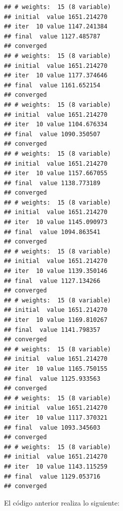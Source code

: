 \documentclass[
  spanish,
  12pt,
]{book}
\begin{document}
\begin{verbatim}
## # weights:  15 (8 variable)
## initial  value 1651.214270 
## iter  10 value 1147.241384
## final  value 1127.485787 
## converged
## # weights:  15 (8 variable)
## initial  value 1651.214270 
## iter  10 value 1177.374646
## final  value 1161.652154 
## converged
## # weights:  15 (8 variable)
## initial  value 1651.214270 
## iter  10 value 1104.676334
## final  value 1090.350507 
## converged
## # weights:  15 (8 variable)
## initial  value 1651.214270 
## iter  10 value 1157.667055
## final  value 1138.773189 
## converged
## # weights:  15 (8 variable)
## initial  value 1651.214270 
## iter  10 value 1145.090973
## final  value 1094.863541 
## converged
## # weights:  15 (8 variable)
## initial  value 1651.214270 
## iter  10 value 1139.350146
## final  value 1127.134266 
## converged
## # weights:  15 (8 variable)
## initial  value 1651.214270 
## iter  10 value 1169.810267
## final  value 1141.798357 
## converged
## # weights:  15 (8 variable)
## initial  value 1651.214270 
## iter  10 value 1165.750155
## final  value 1125.933563 
## converged
## # weights:  15 (8 variable)
## initial  value 1651.214270 
## iter  10 value 1117.370321
## final  value 1093.345603 
## converged
## # weights:  15 (8 variable)
## initial  value 1651.214270 
## iter  10 value 1143.115259
## final  value 1129.053716 
## converged
\end{verbatim}

El código anterior realiza lo siguiente:
\end{document}
